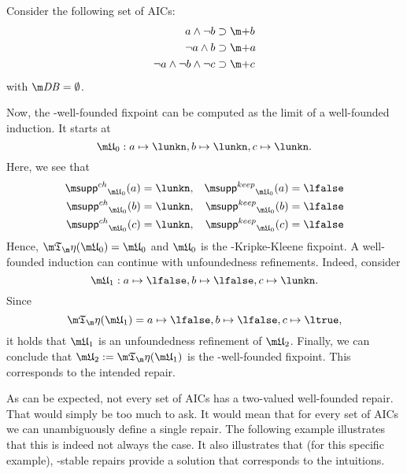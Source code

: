 \begin{example}
 Consider the following set \aics of AICs:
\begin{align*}
 a \land \lnot b&\aicrule \add b\\
 \lnot a \land b &\aicrule \add a \\
 \lnot a \land \lnot b \land \lnot c &\aicrule \add c
 \end{align*} with $\db = \emptyset$.

Now, the \Ap-well-founded fixpoint can be computed as the limit of a well-founded induction. It starts at
\[\UUU_0: a\mapsto \lunkn, b\mapsto \lunkn, c\mapsto\lunkn.\]
Here, we see that 
\begin{align*}
 \suppin_{\UUU_0}(a) &= \lunkn, & \suppout_{\UUU_0}(a) &=\lfalse \\
 \suppin_{\UUU_0}(b) &= \lunkn, & \suppout_{\UUU_0}(b) &=\lfalse \\
 \suppin_{\UUU_0}(c) &= \lunkn, & \suppout_{\UUU_0}(c) &=\lfalse 
\end{align*}
Hence, $\Ap(\UUU_0)=\UUU_0$ and $\UUU_0$ is the \Ap-Kripke-Kleene fixpoint. 
A well-founded induction can continue with unfoundedness refinements. Indeed, consider 
\[\UUU_1: a\mapsto \lfalse, b\mapsto \lfalse, c\mapsto\lunkn.\]
Since 
\[\Ap(\UUU_1) = a\mapsto \lfalse, b\mapsto \lfalse, c\mapsto \ltrue,\] it holds that $\UUU_1$ is an unfoundedness refinement of $\UUU_2$. 
Finally, we can conclude that $\UUU_2:=\Ap(\UUU_1)$ is the \Ap-well-founded fixpoint. This corresponds to the intended repair. 
\end{example}

As can be expected, not every set of AICs has a two-valued well-founded repair. That would simply be too much to ask. It would mean that for every set of AICs we can unambiguously define a single repair. The following example illustrates that this is indeed not always the case. It also illustrates that (for this specific example), \Ap-stable repairs provide a solution that corresponds to the intuitions. 

